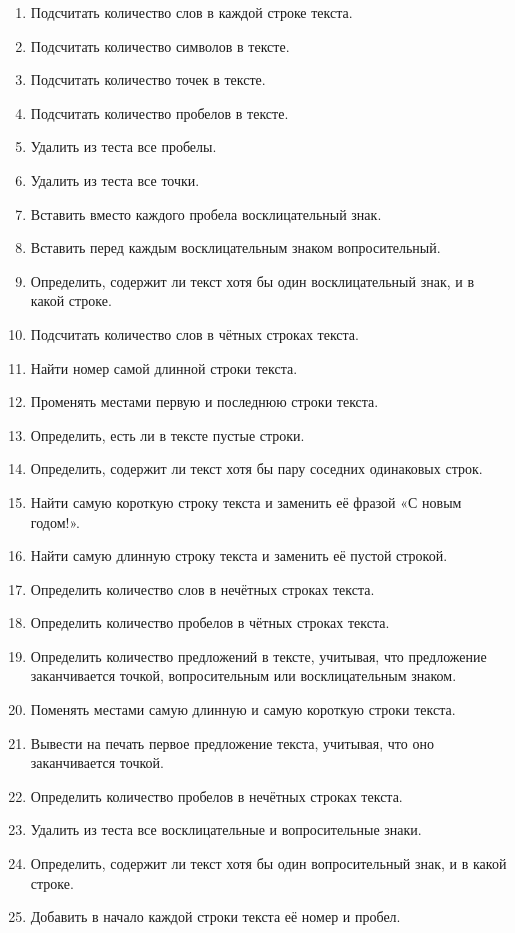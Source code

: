 \begin{enumerate}
\item Подсчитать количество слов в каждой строке текста.
\item Подсчитать количество символов в тексте.
\item Подсчитать количество точек в тексте.
\item Подсчитать количество пробелов в тексте.
\item Удалить из теста все пробелы.
\item Удалить из теста все точки.
\item Вставить вместо каждого пробела восклицательный знак.
\item Вставить перед каждым восклицательным знаком вопросительный.
\item Определить, содержит ли текст хотя бы один восклицательный знак, и в какой строке.
\item Подсчитать количество слов в чётных строках текста.
\item Найти номер самой длинной строки текста.
\item Променять местами первую и последнюю строки текста.
\item Определить, есть ли в тексте пустые строки.
\item Определить, содержит ли текст хотя бы пару соседних одинаковых строк.
\item Найти самую короткую строку текста и заменить её фразой «С новым годом!».
\item Найти самую длинную строку текста и заменить её пустой строкой.
\item Определить количество слов в нечётных строках текста.
\item Определить количество пробелов в чётных строках текста.
\item Определить количество предложений в тексте, учитывая, что предложение заканчивается точкой, вопросительным или
восклицательным знаком.
\item Поменять местами самую длинную и самую короткую строки текста.
\item Вывести на печать первое предложение текста, учитывая, что оно заканчивается точкой.
\item Определить количество пробелов в нечётных строках текста.
\item Удалить из теста все восклицательные и вопросительные знаки.
\item Определить, содержит ли текст хотя бы один вопросительный знак, и в какой строке.
\item Добавить в начало каждой строки текста её номер и пробел.
\end{enumerate}
